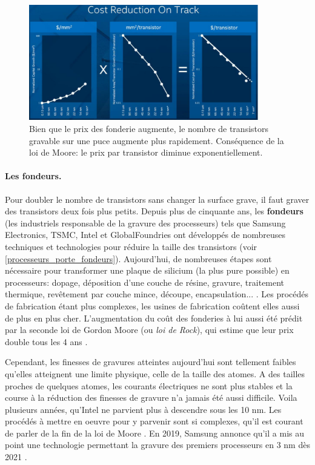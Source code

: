 \begin{figure}
    \center
    \includegraphics[width=10cm]{images/processeurs_porte_moore.png}
    \caption{\label{pic_Moore_explique} Bien que le prix des fonderie augmente, le nombre de transistors gravable sur une puce augmente plus rapidement. Conséquence de la loi de Moore: le prix par transistor diminue exponentiellement.}
\end{figure}



\paragraph{Les fondeurs.}
Pour doubler le nombre de transistors sans changer la surface grave, il faut graver des transistors deux fois plus petits. 
Depuis plus de cinquante ans, les \textbf{fondeurs} (les industriels responsable de la gravure des processeurs) tels que Samsung Electronics, TSMC, Intel et GlobalFoundries ont développés de nombreuses techniques et technologies pour réduire la taille des transistors (voir \autoref{processeurs_porte_fondeurs}). Aujourd'hui, de nombreuses étapes sont nécessaire pour transformer une plaque de silicium (la plus pure possible) en processeurs: dopage, déposition d'une couche de résine, gravure, traitement thermique, revêtement par couche mince, découpe, encapsulation... \cite{AnthonyNelzinSantos2018}.
Les procédés de fabrication étant plus complexes, les usines de fabrication coûtent elles aussi de plus en plus cher. L'augmentation du coût des fonderies à lui aussi été prédit par la seconde loi de Gordon Moore (ou \textit{loi de Rock}), qui estime que leur prix double tous les 4 ans \cite{schaller1997moore}.


Cependant, les finesses de gravures atteintes aujourd'hui sont tellement faibles qu'elles atteignent une limite physique, celle de la taille des atomes. A des tailles proches de quelques atomes, les courants électriques ne sont plus stables et la course à la réduction des finesses de gravure n'a jamais été aussi difficile.
Voila plusieurs années, qu'Intel ne parvient plus à descendre sous les 10 nm. Les procédés à mettre en oeuvre pour y parvenir sont si complexes, qu'il est courant de parler de la fin de la loi de Moore \cite{theis2017end}.
En 2019, Samsung annonce qu'il a mis au point une technologie permettant la gravure des premiers processeurs en 3 nm dès 2021 \cite{AdrianBRANCO2019}. 


